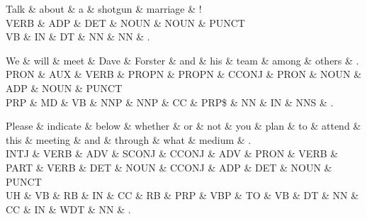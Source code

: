 \begin{dependency}
\begin{deptext}
Talk \& about \& a \& shotgun \& marriage \& ! \\
VERB \& ADP \& DET \& NOUN \& NOUN \& PUNCT \\
VB \& IN \& DT \& NN \& NN \& . \\
\end{deptext}



\end{dependency}

\begin{dependency}
\begin{deptext}
We \& will \& meet \& Dave \& Forster \& and \& his \& team \& among \& others \& . \\
PRON \& AUX \& VERB \& PROPN \& PROPN \& CCONJ \& PRON \& NOUN \& ADP \& NOUN \& PUNCT \\
PRP \& MD \& VB \& NNP \& NNP \& CC \& PRP\$ \& NN \& IN \& NNS \& . \\
\end{deptext}



\end{dependency}

\begin{dependency}
\begin{deptext}
Please \& indicate \& below \& whether \& or \& not \& you \& plan \& to \& attend \& this \& meeting \& and \& through \& what \& medium \& . \\
INTJ \& VERB \& ADV \& SCONJ \& CCONJ \& ADV \& PRON \& VERB \& PART \& VERB \& DET \& NOUN \& CCONJ \& ADP \& DET \& NOUN \& PUNCT \\
UH \& VB \& RB \& IN \& CC \& RB \& PRP \& VBP \& TO \& VB \& DT \& NN \& CC \& IN \& WDT \& NN \& . \\
\end{deptext}



\end{dependency}

